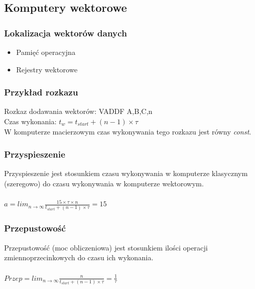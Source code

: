 \documentclass[a4paper,twoside]{article}
\begin{document}
		\subsection*{Komputery wektorowe}
			\subsubsection*{Lokalizacja wektorów danych}
			\begin{itemize}
				\item Pamięć operacyjna
				\item Rejestry wektorowe
			\end{itemize}
			\subsubsection*{Przykład rozkazu}
			Rozkaz dodawania wektorów: VADDF A,B,C,n\\
			Czas wykonania: $t_{w}=t_{start}+(n-1)\times\tau$\\
			W komputerze macierzowym czas wykonywania tego rozkazu jest równy \emph{const}.
			
			\subsubsection*{Przyspieszenie}
			Przyspieszenie jest stosunkiem czasu wykonywania w komputerze klasycznym (szeregowo) do czasu wykonywania w komputerze wektorowym.\\\\
			$a=lim_{n \to \infty}\frac{15\times\tau\times n}{t_{start}+(n-1)\times\tau}=15$
			
			\subsubsection*{Przepustowość}
			Przepustowość (moc obliczeniowa) jest stosunkiem ilości operacji zmiennoprzecinkowych do czasu ich wykonania.\\\\
			$Przep=lim_{n \to \infty}\frac{n}{t_{start}+(n-1)\times\tau}=\frac{1}{\tau}$
		
\end{document}
